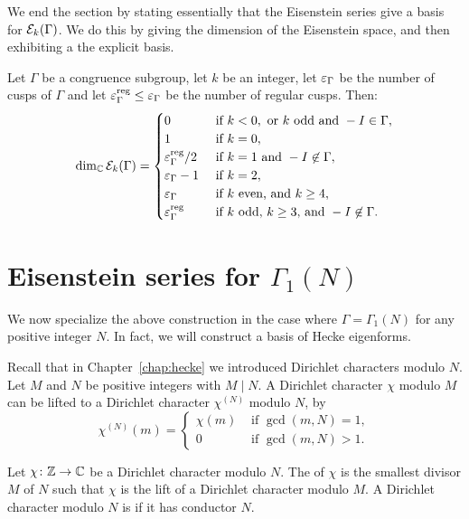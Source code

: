 We end the section by stating essentially that the Eisenstein series give a basis for $\mathcal{E}_k(\Gamma)$. We do this by giving the dimension of the Eisenstein space, and then exhibiting a the explicit basis.
\begin{theorem}
  Let $\Gamma$ be a congruence subgroup, let $k$ be an integer, let $\varepsilon_\Gamma$ be the number of cusps of $\Gamma$ and let $\varepsilon^\text{reg}_\Gamma\leq\varepsilon_\Gamma$ be the number of regular cusps. Then:
\[
\dim_{\mathbb{C}} \mathcal{E}_k(\Gamma)=\begin{cases}
0&\text{ if }k<0,\text{ or }k\text{ odd and }-I\in\Gamma,\\
1&\text{ if }k=0,\\
\varepsilon_\Gamma^\text{reg}/2&\text{ if }k=1\text{ and } -I\not\in\Gamma,\\
\varepsilon_\Gamma-1&\text{ if }k=2,\\
\varepsilon_\Gamma&\text{ if }k\text{ even, and } k\geq 4,\\
\varepsilon_\Gamma^\text{reg}&\text{ if }k\text{ odd, }k\geq 3\text{, and } -I\not\in\Gamma.\\
\end{cases}
\]
\end{theorem}

\section{Eisenstein series for $\Gamma_1(N)$}
We now specialize the above construction in the case where $\Gamma=\Gamma_1(N)$ for any positive integer $N$. In fact, we will construct a basis of Hecke eigenforms.

Recall that in Chapter~\ref{chap:hecke} we introduced Dirichlet characters modulo $N$. Let $M$ and $N$ be positive integers with $M\mid N$. A Dirichlet character $\chi$ modulo $M$ can be lifted to a Dirichlet character $\chi^{(N)}$ modulo $N$, by
\[
\chi^{(N)}(m)=\begin{cases}
\chi(m)&\text{ if }\gcd(m,N)=1,\\
0&\text{ if }\gcd(m,N)>1.
\end{cases}
\]
\begin{definition}
  Let $\chi\colon \mathbb{Z}\to\mathbb{C}$ be a Dirichlet character modulo $N$. The  of $\chi$ is the smallest divisor $M$ of $N$ such that $\chi$ is the lift of a Dirichlet character modulo $M$. A Dirichlet character modulo $N$ is  if it has conductor $N$.
\end{definition}

